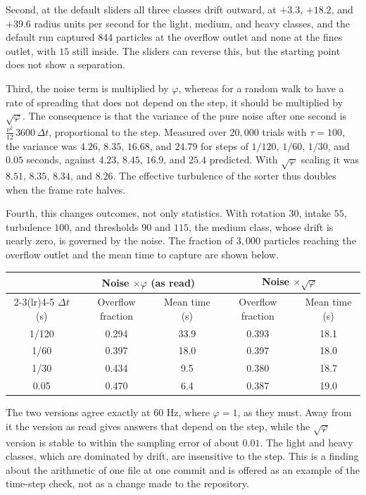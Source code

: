 Second, at the default sliders all three classes drift outward, at $+3.3$, $+18.2$, and $+39.6$ radius units per second for the light, medium, and heavy classes, and the default run captured $844$ particles at the overflow outlet and none at the fines outlet, with $15$ still inside. The sliders can reverse this, but the starting point does not show a separation.

Third, the noise term is multiplied by $\varphi$, whereas for a random walk to have a rate of spreading that does not depend on the step, it should be multiplied by $\sqrt{\varphi}$. The consequence is that the variance of the pure noise after one second is $\tfrac{\nu^2}{12}\,3600\,\Delta t$, proportional to the step. Measured over $20{,}000$ trials with $\tau=100$, the variance was $4.26$, $8.35$, $16.68$, and $24.79$ for steps of $1/120$, $1/60$, $1/30$, and $0.05$ seconds, against $4.23$, $8.45$, $16.9$, and $25.4$ predicted. With $\sqrt\varphi$ scaling it was $8.51$, $8.35$, $8.34$, and $8.26$. The effective turbulence of the sorter thus doubles when the frame rate halves.

Fourth, this changes outcomes, not only statistics. With rotation $30$, intake $55$, turbulence $100$, and thresholds $90$ and $115$, the medium class, whose drift is nearly zero, is governed by the noise. The fraction of $3{,}000$ particles reaching the overflow outlet and the mean time to capture are shown below.

\begin{center}
\begin{tabular}{@{}ccccc@{}}
\toprule
 & \multicolumn{2}{c}{Noise $\times\varphi$ (as read)} & \multicolumn{2}{c}{Noise $\times\sqrt\varphi$}\\
\cmidrule(lr){2-3}\cmidrule(lr){4-5}
$\Delta t$ (s) & Overflow fraction & Mean time (s) & Overflow fraction & Mean time (s)\\
\midrule
1/120 & 0.294 & 33.9 & 0.393 & 18.1\\
1/60 & 0.397 & 18.0 & 0.397 & 18.0\\
1/30 & 0.434 & 9.5 & 0.380 & 18.7\\
0.05 & 0.470 & 6.4 & 0.387 & 19.0\\
\bottomrule
\end{tabular}
\end{center}

The two versions agree exactly at $60$ Hz, where $\varphi=1$, as they must. Away from it the version as read gives answers that depend on the step, while the $\sqrt\varphi$ version is stable to within the sampling error of about $0.01$. The light and heavy classes, which are dominated by drift, are insensitive to the step. This is a finding about the arithmetic of one file at one commit and is offered as an example of the time-step check, not as a change made to the repository.


